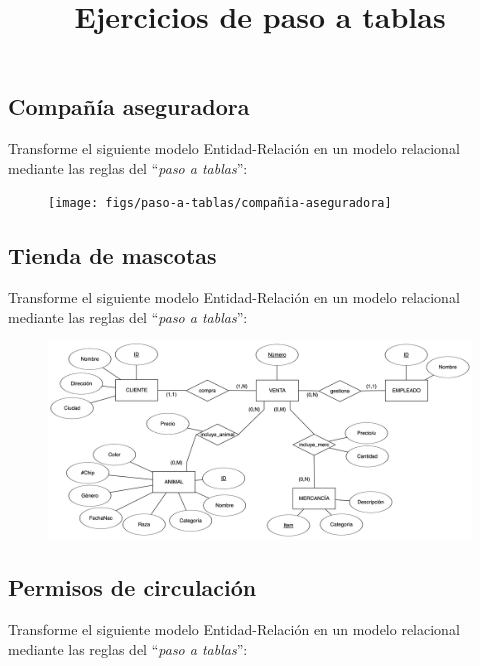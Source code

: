 \documentclass{db-practice}
\title{Ejercicios de paso a tablas}
\begin{document}
\maketitle

\subsection{Compañía aseguradora}

Transforme el siguiente modelo Entidad-Relación en un modelo relacional mediante las reglas del ``\textit{paso a tablas}'':

\begin{figure}[H]
    \centering
    \texttt{[image: figs/paso-a-tablas/compañia-aseguradora]}
\end{figure}

\subsection{Tienda de mascotas}

Transforme el siguiente modelo Entidad-Relación en un modelo relacional mediante las reglas del ``\textit{paso a tablas}'':

\begin{figure}[H]
    \centering
    \includegraphics[width=\textwidth]{figs/paso-a-tablas/tienda-de-mascotas}
\end{figure}

\newpage
\subsection{Permisos de circulación}

Transforme el siguiente modelo Entidad-Relación en un modelo relacional mediante las reglas del ``\textit{paso a tablas}'':
\end{document}
